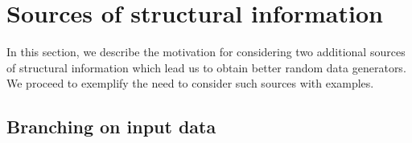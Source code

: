 \section{Sources of structural information}


In this section, we describe the motivation for considering two additional
sources of structural information which lead us to obtain better random data
generators. %
%
%
%
We proceed to exemplify the need to consider such sources with examples.

\subsection{Branching on input data}


